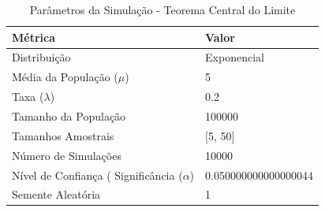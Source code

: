 \begin{table}[H]
\centering
\caption{Parâmetros da Simulação - Teorema Central do Limite}
\label{tab:parametros_tcl}
\begin{tabular}{lp{8cm}}
\toprule
Métrica & Valor \\
\midrule
Distribuição & Exponencial \\
Média da População ($\mu$) & 5 \\
Taxa ($\lambda$) & 0.2 \\
Tamanho da População & 100000 \\
Tamanhos Amostrais & [5, 50] \\
Número de Simulações & 10000 \\
Nível de Confiança (%
Significância ($\alpha$) & 0.050000000000000044 \\
Semente Aleatória & 1 \\
\bottomrule
\end{tabular}
\end{table}